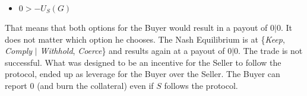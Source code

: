 \documentclass{cacthesis}
\begin{document}
\begin{itemize}
    \item $0> -U_S(G)$
\end{itemize}
That means that both options for the Buyer would result in a payout of $0|0$. It does not matter which option he chooses.
The Nash Equilibrium is at \{\emph{Keep}, \emph{Comply} $|$ \emph{Withhold}, \emph{Coerce}\} and results again at a payout of $0|0$. The trade is not successful.
What was designed to be an incentive for the Seller to follow the protocol, ended up as leverage for the Buyer over the Seller. The Buyer can report 0 (and burn the collateral) even if $S$ follows the protocol. 
\newpage
\end{document}
